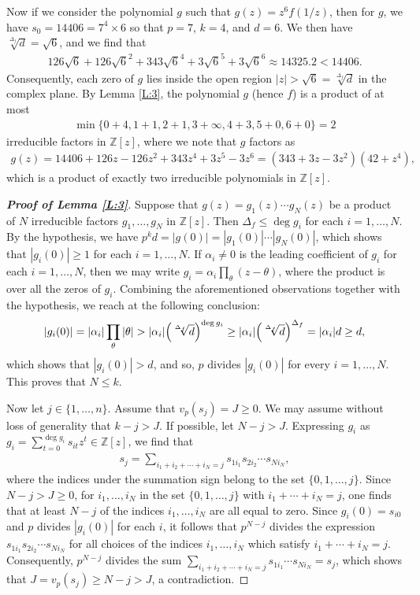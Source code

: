 \documentclass[12pt]{amsart}%
\begin{document}
Now if we consider the polynomial $g$ such that $g(z)=z^6f(1/z)$, then for $g$, we have $s_0=14406=7^4\times 6$ so that $p=7$, $k=4$, and $d=6$. We then have $\sqrt[\Delta_f]{d}=\sqrt{6}$, and we find that
\begin{eqnarray*}
126\sqrt{6}+126 \sqrt{6}^2+343\sqrt{6}^4+3\sqrt{6}^5+3\sqrt{6}^6\approx 14325.2 < 14406.
\end{eqnarray*}
Consequently, each zero of $g$ lies inside the open region $|z|>\sqrt{6}=\sqrt[\Delta_f]{d}$ in the complex plane.
By Lemma \ref{L:3}, the polynomial $g$ (hence $f$) is a product of at most
\begin{eqnarray*}
\min\{0+4,1+1,2+1,3+\infty,4+3,5+0,6+0\}=2
\end{eqnarray*}
irreducible factors in $\mathbb{Z}[z]$, where we note that $g$ factors as
\begin{eqnarray*}
g(z)=14406+126 z-126z^2+343z^4+3z^5-3z^6=(343+3 z-3z^2)(42+z^4),
\end{eqnarray*}
which is a product of exactly two irreducible polynomials in $\mathbb{Z}[z]$.
\begin{proof}[\bf Proof of Lemma \ref{L:3}]
Suppose that  $g(z)=g_1(z)\cdots g_N(z)$ be a product of $N$ irreducible factors $g_1,\hdots ,g_N$ in $\mathbb{Z}[z]$. Then $\Delta_f\leq \deg g_i$ for each $i=1,\ldots, N$. By the hypothesis, we have  $p^kd = |g(0)|= |g_1(0)| \cdots |g_N(0)|$, which shows that $|g_i(0)|\geq 1$ for each $i = 1, \hdots,N$. If $\alpha_i \neq 0$ is the leading coefficient of $g_i$ for each $i=1,\ldots, N$, then we may write $g_i= \alpha_i\prod_{\theta}(z-\theta)$, where the product is over all the zeros of $g_i$. Combining the aforementioned observations together with the hypothesis, we reach at the following conclusion:
\begin{eqnarray*}
|g_i(0)|=|\alpha_i|\prod_{\theta}|\theta| > |\alpha_i|\Bigl(\sqrt[\Delta_f]{d}\Bigr)^{\deg g_i} \geq |\alpha_i|\Bigl(\sqrt[\Delta_f]{d}\Bigr)^{\Delta_f}=|\alpha_i|d\geq d,
\end{eqnarray*} which shows that $|g_i(0)|>d$, and so, $p$ divides $|g_i(0)|$ for every $i = 1, \hdots,N$. This proves that $N \leq k$.

Now let $j\in \{1,\ldots, n\}$. Assume that $v_p(s_j)=J\geq 0$. We may assume without loss of generality that $k-j>J$. If possible, let $N-j>J$. Expressing $g_i$ as $g_i= \sum_{t=0}^{\deg g_i}s_{it}z^t \in \mathbb{Z}[z]$,  we find that
\begin{eqnarray*}
s_j = \sum_{i_1+i_2+\cdots +i_N=j} s_{1i_1}s_{2i_2}\cdots s_{Ni_N},
\end{eqnarray*}
where the indices under the summation sign belong to the set $\{0,1,\ldots, j\}$.  Since $N-j>J \geq 0$, for  $i_1, \ldots, i_N$ in the set $\{0,1,\ldots, j\}$ with $i_1 +\cdots +i_N = j$, one finds that at least $N-j$ of the indices $i_1, \ldots, i_N$ are all equal to zero. Since $g_i(0)=s_{i0}$ and $p$ divides $|g_i(0)|$ for each $i$, it follows that $p^{N-j}$ divides the expression $s_{1i_1}s_{2i_2}\cdots s_{Ni_N}$ for all choices of the indices $i_1,\ldots, i_N$ which satisfy $i_1+\cdots+i_N=j$. Consequently, $p^{N-j}$ divides the sum $\sum_{i_1+i_2+\cdots +i_N=j}s_{1i_1}\cdots s_{Ni_N}=s_j$, which shows that $J=v_p(s_j)\geq N-j>J$, a contradiction.
\end{proof}
\end{document}
